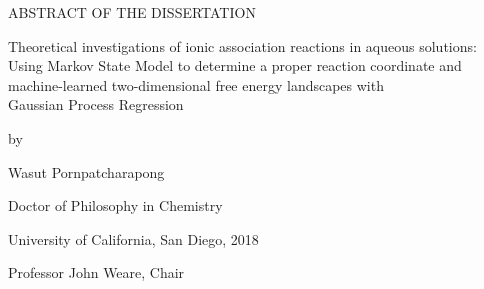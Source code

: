 \newpage

\begingroup
\vspace*{1.5in}
\begin{center}
    {ABSTRACT OF THE DISSERTATION}
\end{center}
\endgroup

\vspace{1.2cm}

\begin{center}
    \begin{spacing}{1.0}
    {Theoretical investigations of ionic association reactions in aqueous solutions: \\
    Using Markov State Model to determine a proper reaction coordinate and \\
    machine-learned two-dimensional free energy landscapes with \\
    Gaussian Process Regression}
    \end{spacing}

    \vspace{0.6cm}

    by

    \vspace{0.6cm}

    \begin{spacing}{1.0}
        Wasut Pornpatcharapong

        Doctor of Philosophy in Chemistry

        University of California, San Diego, 2018
    \end{spacing}

    \vspace{0.6cm}

    Professor John Weare, Chair
\end{center}

\vspace{0.6cm}

